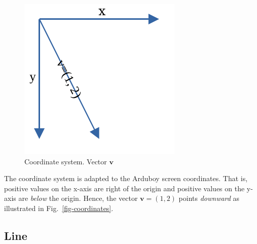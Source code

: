 \documentclass[11pt]{article}
\newcommand{\vb}{\mathbf{v}}
\newcommand{\figref}[1]{Fig.~\eqref{#1}}
\begin{document}
\begin{figure}
    \centering
    \includegraphics{odg/coordinates.pdf}
    \caption{Coordinate system. Vector $\vb$}\label{fig-coordinates}
\end{figure}
The coordinate system is adapted to the Arduboy screen coordinates. That is,
positive values on the x-axis are right of the origin and positive values on
the y-axis are \textsl{below} the origin. Hence, the vector $\vb=(1, 2)$ points
\textsl{downward} as illustrated in \figref{fig-coordinates}.

\subsection{Line}
\label{sec-representation-line}
\end{document}

